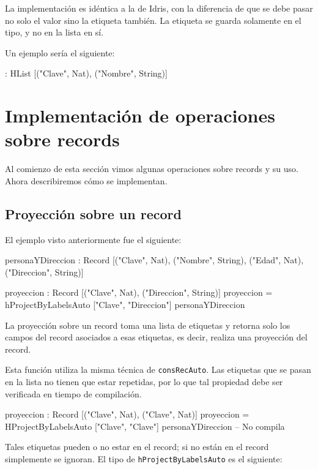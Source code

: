 La implementación es idéntica a la de Idris, con la diferencia de que se debe pasar no solo el valor sino la etiqueta también. La etiqueta se guarda solamente en el tipo, y no en la lista en sí.

Un ejemplo sería el siguiente:

\begin{code}
[1, "Juan"] :
  HList [("Clave", Nat), ("Nombre", String)]
\end{code}

\section{Implementación de operaciones sobre records}

Al comienzo de esta sección vimos algunas operaciones sobre records y su uso. Ahora describiremos cómo se implementan.

\subsection{Proyección sobre un record}

El ejemplo visto anteriormente fue el siguiente:

\begin{code}
personaYDireccion : Record [("Clave", Nat), ("Nombre", String),
  ("Edad", Nat), ("Direccion", String)]

proyeccion : Record [("Clave", Nat), ("Direccion", String)]
proyeccion = hProjectByLabelsAuto ["Clave", "Direccion"]
  personaYDireccion
\end{code}

La proyección sobre un record toma una lista de etiquetas y retorna solo los campos del record asociados a esas etiquetas, es decir, realiza una proyección del record.

Esta función utiliza la misma técnica de \texttt{consRecAuto}. Las etiquetas que se pasan en la lista no tienen que estar repetidas, por lo que tal propiedad debe ser verificada en tiempo de compilación. 

\begin{code}
proyeccion : Record [("Clave", Nat), ("Clave", Nat)]
proyeccion = HProjectByLabelsAuto ["Clave", "Clave"]
  personaYDireccion
-- No compila
\end{code}

Tales etiquetas pueden o no estar en el record; si no están en el record simplemente se ignoran. El tipo de \texttt{hProjectByLabelsAuto} es el siguiente:

